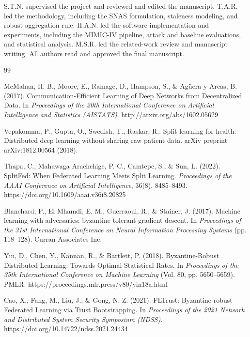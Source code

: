 \documentclass[pdflatex,sn-mathphys-num]{sn-jnl}
\begin{document}
 S.T.N. supervised the project and reviewed and edited the manuscript. T.A.R. led the methodology, including the SNAS formulation, staleness modeling, and robust aggregation rule. H.A.N. led the software implementation and experiments, including the MIMIC-IV pipeline, attack and baseline evaluations, and statistical analysis. M.S.R. led the related-work review and manuscript writing. All authors read and approved the final manuscript.

\begin{thebibliography}{99}

McMahan, H. B., Moore, E., Ramage, D., Hampson, S., \& Agüera y Arcas, B. (2017). Communication-Efficient Learning of Deep Networks from Decentralized Data. In \textit{Proceedings of the 20th International Conference on Artificial Intelligence and Statistics (AISTATS)}. http://arxiv.org/abs/1602.05629

Vepakomma, P., Gupta, O., Swedish, T., Raskar, R.: Split learning for health: Distributed deep learning without sharing raw patient data. arXiv preprint arXiv:1812.00564 (2018).

Thapa, C., Mahawaga Arachchige, P. C., Camtepe, S., \& Sun, L. (2022). SplitFed: When Federated Learning Meets Split Learning. \textit{Proceedings of the AAAI Conference on Artificial Intelligence}, 36(8), 8485--8493. https://doi.org/10.1609/aaai.v36i8.20825

Blanchard, P., El Mhamdi, E. M., Guerraoui, R., \& Stainer, J. (2017). Machine learning with adversaries: byzantine tolerant gradient descent. In \textit{Proceedings of the 31st International Conference on Neural Information Processing Systems} (pp. 118--128). Curran Associates Inc.

Yin, D., Chen, Y., Kannan, R., \& Bartlett, P. (2018). Byzantine-Robust Distributed Learning: Towards Optimal Statistical Rates. In \textit{Proceedings of the 35th International Conference on Machine Learning} (Vol. 80, pp. 5650--5659). PMLR. https://proceedings.mlr.press/v80/yin18a.html

Cao, X., Fang, M., Liu, J., \& Gong, N. Z. (2021). FLTrust: Byzantine-robust Federated Learning via Trust Bootstrapping. In \textit{Proceedings of the 2021 Network and Distributed System Security Symposium (NDSS)}. https://doi.org/10.14722/ndss.2021.24434


\end{thebibliography}
\end{document}
